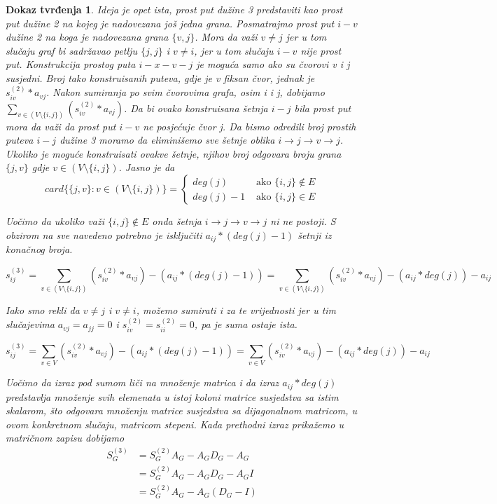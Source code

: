 \documentclass[11pt]{article}
\newtheorem*{custom_proof}{Dokaz tvrđenja}
\begin{document}
			\begin{custom_proof}
			Ideja je opet ista, prost put dužine 3 predstaviti kao prost put dužine 2 na kojeg je nadovezana još jedna grana.
			Posmatrajmo prost put $i-v$ dužine 2 na koga je nadovezana grana $\{v,j\}$. 
			Mora da važi $v \neq j$ jer u tom slučaju graf bi sadržavao petlju $\{j,j\}$ i $v \neq i$, jer u tom slučaju $i-v$ nije prost put. 
			Konstrukcija prostog puta $i-x-v-j$ je moguća samo ako su čvorovi v i j susjedni. 
			Broj tako konstruisanih puteva, gdje je v fiksan čvor, jednak je $s_{iv}^{(2)} * a_{vj}$.
			Nakon sumiranja po svim čvorovima grafa, osim i i j, dobijamo $\sum_{v \in (V \setminus \{i,j\})} (s_{iv}^{(2)} * a_{vj})$.
			Da bi ovako konstruisana šetnja $i-j$ bila prost put mora da važi da prost put $i-v$ ne posjećuje čvor j. 
			Da bismo odredili broj prostih puteva $i-j$ dužine 3 moramo da eliminišemo sve šetnje oblika $i \rightarrow j \rightarrow v \rightarrow j$. 
			Ukoliko je moguće konstruisati ovakve šetnje, njihov broj odgovara broju grana $\{j,v\}$ gdje $v \in (V \setminus \{i,j\})$. Jasno je da 
			\[
				card\{\{j,v\}:  v \in (V \setminus \{i,j\})\} =
				\begin{cases}
				deg(j) & \text{ ako } \{i,j\} \notin E  \\ 
				deg(j) -1 & \text{ ako } \{i,j\} \in E   
				\end{cases} 
			\]
		
			Uočimo da ukoliko važi $\{i,j\} \notin E$ onda šetnja $i \rightarrow j \rightarrow v \rightarrow j$ ni ne postoji.
			S obzirom na sve navedeno potrebno je isključiti $a_{ij} * (deg(j) - 1)$ šetnji iz konačnog broja.
		
			\[
			s_{ij}^{(3)} =  \sum_{v \in (V \setminus \{i,j\})} (s_{iv}^{(2)} * a_{vj}) - (a_{ij} * (deg(j)  - 1))
				       = \sum_{v \in (V \setminus \{i,j\})} (s_{iv}^{(2)} * a_{vj}) - (a_{ij} * deg(j)) - a_{ij}
			\] 
		
			Iako smo rekli da $v \neq j$ i $v \neq i$, možemo sumirati i za te vrijednosti jer u tim slučajevima $a_{vj} = a_{jj} = 0$ i $s_{iv}^{(2)} = s_{ii}^{(2)} = 0$, pa je suma ostaje ista.
			
			\[
			s_{ij}^{(3)} =  \sum_{v \in V} (s_{iv}^{(2)} * a_{vj}) - (a_{ij} * (deg(j)  - 1))
				       = \sum_{v \in V} (s_{iv}^{(2)} * a_{vj}) - (a_{ij} * deg(j)) - a_{ij}
			\] 
		 
			Uočimo da izraz pod sumom liči na množenje matrica i da izraz $a_{ij} * deg(j)$ predstavlja množenje svih elemenata u istoj koloni matrice susjedstva sa istim skalarom,
			što odgovara množenju matrice susjedstva sa dijagonalnom matricom, u ovom konkretnom slučaju, matricom stepeni. Kada prethodni izraz prikažemo u matričnom zapisu dobijamo
			\[
				\begin{split}
					S_G^{(3)} & = S_G^{(2)} A_G - A_G D_G - A_G \\
			 				  & = S_G^{(2)} A_G - A_G D_G - A_G I \\
			    			  & = S_G^{(2)} A_G - A_G (D_G - I) 
				\end{split}
			\]


\end{custom_proof}
\end{document}
